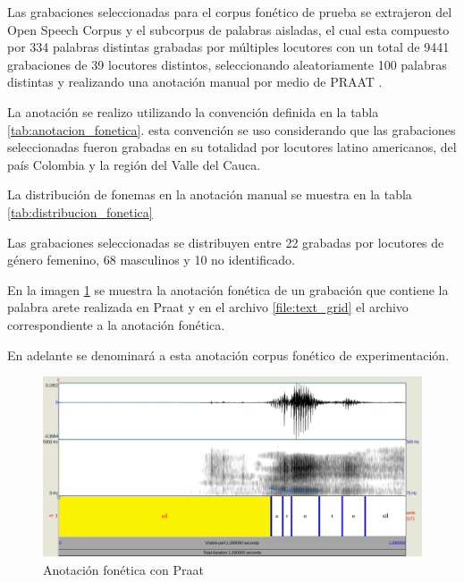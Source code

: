 

Las grabaciones seleccionadas para el corpus fonético de prueba se extrajeron del Open Speech Corpus \cite{Collazos2015} y el subcorpus de palabras aisladas, el cual esta compuesto por 334 palabras distintas grabadas por múltiples locutores con un total de 9441 grabaciones de 39 locutores distintos, seleccionando aleatoriamente 100 palabras distintas y realizando una anotación manual por medio de PRAAT \cite{Praat}.

La anotación se realizo utilizando la convención definida en la tabla \ref{tab:anotacion_fonetica}. esta convención se uso considerando que las grabaciones seleccionadas fueron grabadas en su totalidad por locutores latino americanos, del país Colombia y la región del Valle del Cauca. 



La distribución de fonemas en la anotación manual se muestra en la tabla \ref{tab:distribucion_fonetica}



Las grabaciones seleccionadas se distribuyen entre 22 grabadas por locutores de género femenino, 68 masculinos y 10 no identificado.

En la imagen \ref{img:anotacion_fonetica_praat} se muestra la anotación fonética de un grabación que contiene la palabra arete realizada en Praat y en el archivo \ref{file:text_grid} el archivo correspondiente a la anotación fonética.

En adelante se denominará a esta anotación corpus fonético de experimentación.


\begin{figure}[H]
\caption{Anotación fonética con Praat}
\label{img:anotacion_fonetica_praat}
\includegraphics[width=\textwidth]{imagenes/03_01_anotacion_fonetica.png}
\end{figure}

